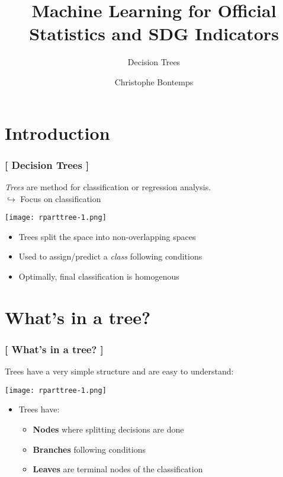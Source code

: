 \documentclass[xcolor=x11names,compress]{beamer}
\title{\textcolor{siap}{Machine Learning for Official Statistics and SDG Indicators \\ \vspace{0.5cm} }}
\subtitle{\textcolor{brique}{\Large{Decision Trees}}}
\author{\textcolor{siap}{Christophe Bontemps}}
\institute{ \texttt{[image: SIAP\_logo\_Big.png]}}
\date{}
\renewcommand{\(}{\begin{columns}}
\renewcommand{\)}{\end{columns}}
\newcommand{\<}[1]{\begin{column}{#1}}
\renewcommand{\>}{\end{column}}
\begin{document}
\begin{frame}
  \titlepage
\end{frame}

\section{Introduction}

\begin{frame} %

\frametitle{\textcolor{brique}{[ Decision Trees ]}}
\textit{Trees} are method for classification or regression analysis.\\
 $\hookrightarrow$ Focus on classification\\
\begin{center} \texttt{[image: rparttree-1.png]} \end{center}
\pause
\begin{itemize}
  \item Trees split the space into non-overlapping spaces
  \item Used to assign/predict a \textit{class} following conditions
  \item Optimally, final classification is homogenous
\end{itemize}
\end{frame}

\section{What's in a tree?}

\begin{frame} %
\frametitle{\textcolor{brique}{[ What's in a tree? ]}}
Trees have a very simple structure and are easy to understand:
\begin{center} \texttt{[image: rparttree-1.png]} \end{center}
\pause
\begin{itemize}
  \item[] Trees have:
  \begin{itemize}[<+->]
    \item \textbf{Nodes} where splitting decisions are done
    \item \textbf{Branches}  following conditions
    \item \textbf{Leaves} are terminal nodes of the classification
  \end{itemize}
\end{itemize}
\end{frame}
\end{document}
